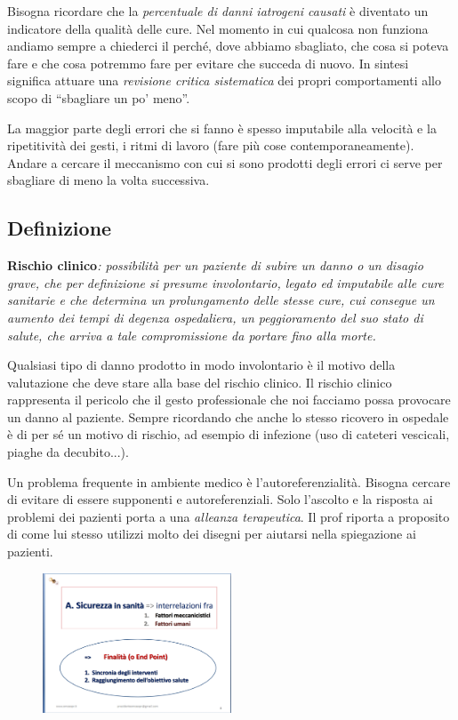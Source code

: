 Bisogna ricordare che la \emph{percentuale di danni iatrogeni causati} è
diventato un indicatore della qualità delle cure. Nel momento in cui
qualcosa non funziona andiamo sempre a chiederci il perché, dove abbiamo
sbagliato, che cosa si poteva fare e che cosa potremmo fare per evitare
che succeda di nuovo. In sintesi significa attuare una \emph{revisione
critica sistematica} dei propri comportamenti allo scopo di ``sbagliare
un po' meno''.

La maggior parte degli errori che si fanno è spesso imputabile alla
velocità e la ripetitività dei gesti, i ritmi di lavoro (fare più cose
contemporaneamente). Andare a cercare il meccanismo con cui si sono
prodotti degli errori ci serve per sbagliare di meno la volta
successiva.

\subsection{Definizione}

\textbf{Rischio clinico}\emph{: possibilità per un paziente di subire un
danno o un disagio grave, che per definizione si presume involontario,
legato ed imputabile alle cure sanitarie e che determina un
prolungamento delle stesse cure, cui consegue un aumento dei tempi di
degenza ospedaliera, un peggioramento del suo stato di salute, che
arriva a tale compromissione da portare fino alla morte.}

Qualsiasi tipo di danno prodotto in modo involontario è il motivo della
valutazione che deve stare alla base del rischio clinico. Il rischio
clinico rappresenta il pericolo che il gesto professionale che noi
facciamo possa provocare un danno al paziente. Sempre ricordando che
anche lo stesso ricovero in ospedale è di per sé un motivo di rischio,
ad esempio di infezione (uso di cateteri vescicali, piaghe da
decubito...).

Un problema frequente in ambiente medico è l'autoreferenzialità. Bisogna
cercare di evitare di essere supponenti e autoreferenziali. Solo
l'ascolto e la risposta ai problemi dei pazienti porta a una
\emph{alleanza terapeutica}. Il prof riporta a proposito di come lui
stesso utilizzi molto dei disegni per aiutarsi nella spiegazione ai
pazienti.

\begin{figure}[!ht]
\centering
	\includegraphics[width=0.5\textwidth]{30/image1.png}
	\end{figure}

